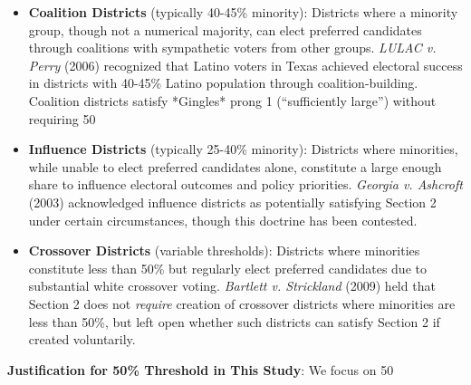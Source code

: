 \begin{itemize}
    \item \textbf{Coalition Districts} (typically 40-45\% minority): Districts where a minority group, though not a numerical majority, can elect preferred candidates through coalitions with sympathetic voters from other groups. \emph{LULAC v. Perry} (2006) recognized that Latino voters in Texas achieved electoral success in districts with 40-45\% Latino population through coalition-building. Coalition districts satisfy *Gingles* prong 1 (``sufficiently large'') without requiring 50%

    \item \textbf{Influence Districts} (typically 25-40\% minority): Districts where minorities, while unable to elect preferred candidates alone, constitute a large enough share to influence electoral outcomes and policy priorities. \emph{Georgia v. Ashcroft} (2003) acknowledged influence districts as potentially satisfying Section 2 under certain circumstances, though this doctrine has been contested.

    \item \textbf{Crossover Districts} (variable thresholds): Districts where minorities constitute less than 50\% but regularly elect preferred candidates due to substantial white crossover voting. \emph{Bartlett v. Strickland} (2009) held that Section 2 does not \emph{require} creation of crossover districts where minorities are less than 50\%, but left open whether such districts can satisfy Section 2 if created voluntarily.
\end{itemize}

\textbf{Justification for 50\% Threshold in This Study}: We focus on 50%

